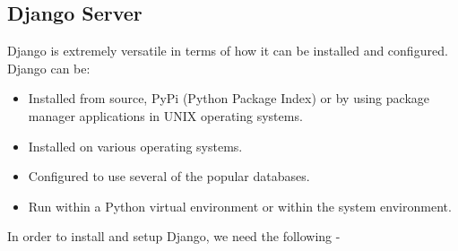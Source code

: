 \documentclass[../thesis.tex]{subfiles}
\begin{document}
	\subsection*{Django Server}
	Django is extremely versatile in terms of how it can be installed and configured. Django can be: 
	\newline

	\begin{itemize}
		\item Installed from source, PyPi (Python Package Index) or by using package manager applications in UNIX operating systems.
		\smallskip
		\item Installed on various operating systems.
		\smallskip
		\item Configured to use several of the popular databases.
		\smallskip
		\item Run within a Python virtual environment or within the system environment.
	\end{itemize}
	In order to install and setup Django, we need the following -
\end{document}
